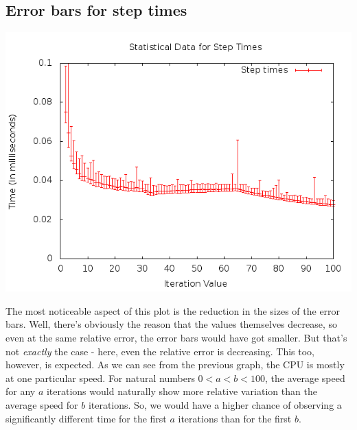 \documentclass[a4paper,11pt]{article}
\begin{document}
		\subsection{Error bars for step times}
			\begin{center}
				\includegraphics[scale=0.5]{./doc/images/g16_plot04.png}
			\end{center}
			
			The most noticeable aspect of this plot is the reduction in the sizes
			of the error bars. Well, there's obviously the reason that the values
			themselves decrease, so even at the same relative error, the error
			bars would have got smaller. But that's not \emph{exactly} the case -
			here, even the relative error is decreasing. This too, however, is
			expected. As we can see from the previous graph, the CPU is mostly at
			one particular speed. For natural numbers $0<a<b<100$, the average
			speed for any $a$ iterations would naturally show more relative
			variation than the average speed for $b$ iterations. So, we would have
			a higher chance of observing a significantly different time for the
			first $a$ iterations than for the first $b$.
		
\end{document}
